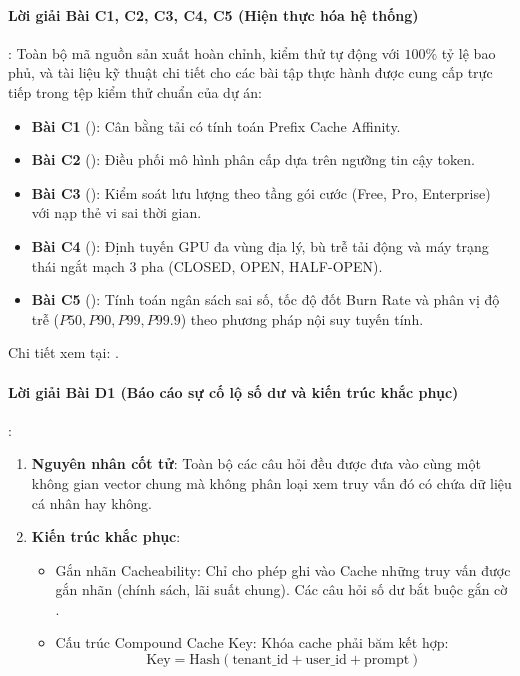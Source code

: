 \paragraph{Lời giải Bài C1, C2, C3, C4, C5 (Hiện thực hóa hệ thống)}:
Toàn bộ mã nguồn sản xuất hoàn chỉnh, kiểm thử tự động với $100\%$ tỷ lệ bao phủ, và tài liệu kỹ thuật chi tiết cho các bài tập thực hành được cung cấp trực tiếp trong tệp kiểm thử chuẩn của dự án:
\begin{itemize}
  \item \textbf{Bài C1} (): Cân bằng tải có tính toán Prefix Cache Affinity.
  \item \textbf{Bài C2} (): Điều phối mô hình phân cấp dựa trên ngưỡng tin cậy token.
  \item \textbf{Bài C3} (): Kiểm soát lưu lượng theo tầng gói cước (Free, Pro, Enterprise) với nạp thẻ vi sai thời gian.
  \item \textbf{Bài C4} (): Định tuyến GPU đa vùng địa lý, bù trễ tải động và máy trạng thái ngắt mạch 3 pha (CLOSED, OPEN, HALF-OPEN).
  \item \textbf{Bài C5} (): Tính toán ngân sách sai số, tốc độ đốt Burn Rate và phân vị độ trễ ($P50, P90, P99, P99.9$) theo phương pháp nội suy tuyến tính.
\end{itemize}
Chi tiết xem tại: .

\paragraph{Lời giải Bài D1 (Báo cáo sự cố lộ số dư và kiến trúc khắc phục)}:
\begin{enumerate}
  \item \textbf{Nguyên nhân cốt tử}: Toàn bộ các câu hỏi đều được đưa vào cùng một không gian vector chung mà không phân loại xem truy vấn đó có chứa dữ liệu cá nhân hay không.
  \item \textbf{Kiến trúc khắc phục}:
    \begin{itemize}
      \item Gắn nhãn Cacheability: Chỉ cho phép ghi vào Cache những truy vấn được gắn nhãn  (chính sách, lãi suất chung). Các câu hỏi số dư bắt buộc gắn cờ .
      \item Cấu trúc Compound Cache Key: Khóa cache phải băm kết hợp:
      \begin{equation*}
      \text{Key} = \text{Hash}(\text{tenant\_id} + \text{user\_id} + \text{prompt})
      \end{equation*}
    \end{itemize}
\end{enumerate}

